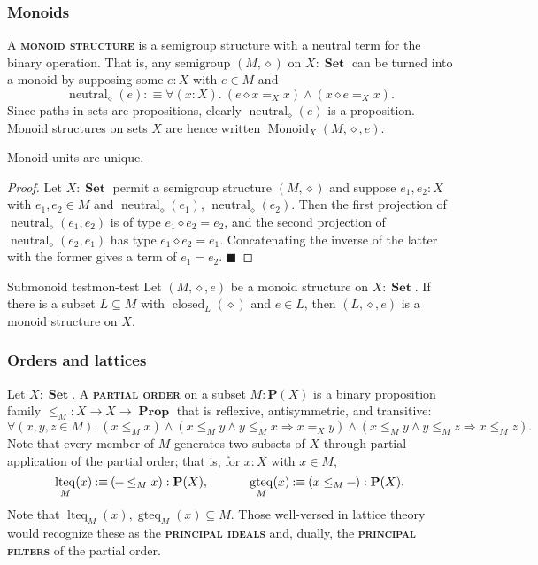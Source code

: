 \documentclass{article}
\newcommand{\defn}[1]{{\scshape\bfseries\color{MPBemph}#1}}
\renewcommand{\qed}{\hfill{\color{MPBthm}\( \blacksquare \)}}
\newcommand{\eql}{\mathbin{:\equiv}}
\newcommand{\1}{\textbf{1}}
\newcommand{\0}{\mathbf{0}}
\newcommand{\2}{\textbf{2}}
\newcommand{\dash}{\rule[0.5ex]{1.5ex}{0.4pt}}
\DeclareMathOperator{\Prop}{\textbf{Prop}}
\DeclareMathOperator{\Set}{\textbf{Set}}
\renewcommand{\P}{\textbf{P}}
\DeclareMathOperator{\closed}{closed}
\DeclareMathOperator{\neutral}{neutral}
\DeclareMathOperator{\Monoid}{Monoid}
\DeclareMathOperator{\lteq}{lteq}
\DeclareMathOperator{\gteq}{gteq}
\begin{document}
\subsubsection{Monoids}
A \defn{monoid structure} is a semigroup structure with a neutral term for the binary operation. That is, any semigroup \( (M, \diamond) \) on \( X : \Set \) can be turned into a monoid by supposing some \( e : X \) with \( e \in M \) and
\[ \neutral_{\diamond}(e) \eql \forall(x : X).~ (e \diamond x =_{X} x) \wedge (x \diamond e =_{X} x). \]
Since paths in sets are propositions, clearly \( \neutral_{\diamond}(e) \) is a proposition. Monoid structures on sets \( X \) are hence written \( \Monoid_{X}(M, \diamond, e) \).
\begin{lemma}{}{} Monoid units are unique.
\begin{proof}
	Let \( X : \Set \) permit a semigroup structure \( (M, \diamond) \) and suppose \( e_{1}, e_{2} : X \) with \( e_{1}, e_{2} \in M \) and \( \neutral_{\diamond}(e_{1}) \), \( \neutral_{\diamond}(e_{2}) \). Then the first projection of \( \neutral_{\diamond}(e_{1}, e_{2}) \) is of type \( e_{1} \diamond e_{2} = e_{2} \), and the second projection of \( \neutral_{\diamond}(e_{2}, e_{1}) \) has type \( e_{1} \diamond e_{2} = e_{1} \). Concatenating  the inverse of the latter with the former gives a term of \( e_{1} = e_{2} \). \qed
\end{proof} \end{lemma}
\begin{thm}{Submonoid test}{mon-test} Let \( (M, \diamond, e) \) be a monoid structure on \( X : \Set \). If there is a subset \( L \subseteq M \) with \( \closed_{L}(\diamond) \) and \( e \in L \), then \( (L, \diamond, e) \) is a monoid structure on \( X \). \end{thm}
\subsubsection{Orders and lattices}
Let \( X : \Set \). A \defn{partial order} on a subset \( M : \P(X) \) is a binary proposition family \( {\leq_{M}} : X \to X \to \Prop \) that is reflexive, antisymmetric, and transitive:
\[ \forall(x, y, z \in M).~ (x \leq_{M} x) \wedge (x \leq_{M} y \wedge y \leq_{M} x \Rightarrow x =_{X} y) \wedge (x \leq_{M} y \wedge y \leq_{M} z \Rightarrow x \leq_{M} z). \]
Note that every member of \( M \) generates two subsets of \( X \) through partial application of the partial order; that is, for \( x : X \) with \( x \in M \),
\[ \lteq_{M}(x) \eql (\dash \leq_{M} x) : \P(X), \hspace{33pt} \gteq_{M}(x) \eql (x \leq_{M} \dash) : \P(X). \]
Note that \( \lteq_{M}(x), \gteq_{M}(x) \subseteq M \). Those well-versed in lattice theory would recognize these as the \defn{principal ideals} and, dually, the \defn{principal filters} of the partial order.
\end{document}
